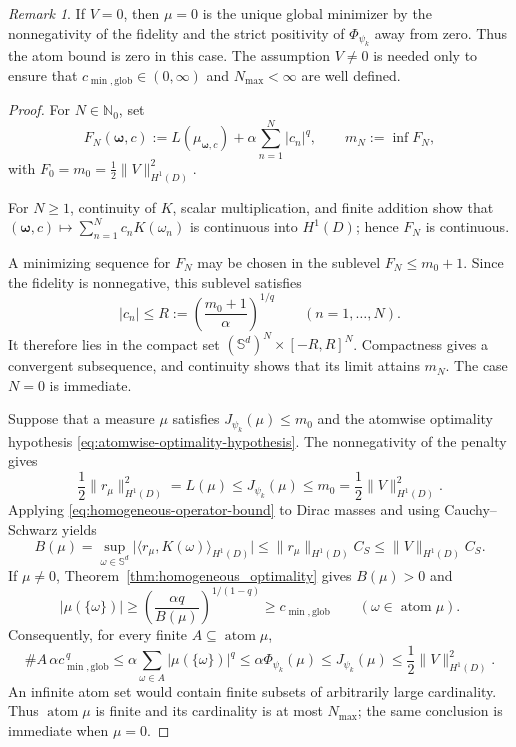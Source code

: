 \documentclass[11pt]{amsart}
\theoremstyle{definition}
\theoremstyle{remark}
\newtheorem{remark}[theorem]{Remark}
\DeclareMathOperator{\atom}{atom}
\begin{document}
\begin{remark}
If $V=0$, then $\mu=0$ is the unique global
minimizer by the nonnegativity of the fidelity and the strict positivity of
$\Phi_{\psi_k}$ away from zero. Thus the atom bound is zero in this case.
The assumption $V\ne0$ is needed only to ensure that
$c_{\min,\mathrm{glob}}\in(0,\infty)$ and $N_{\max}<\infty$ are well defined.
\end{remark}

\begin{proof}
For $N\in\mathbb N_0$, set
\begin{equation*}
	F_N(\boldsymbol\omega,c)
	:=L(\mu_{\boldsymbol\omega,c})+\alpha\sum_{n=1}^N|c_n|^q,
	\qquad m_N:=\inf F_N,
\end{equation*}
with $F_0=m_0=\frac12\|V\|_{H^1(D)}^2$.


For $N\ge1$, continuity of $K$, scalar multiplication, and finite addition
show that
$(\boldsymbol\omega,c)\mapsto\sum_{n=1}^Nc_nK(\omega_n)$ is continuous into
$H^1(D)$; hence $F_N$ is continuous. 

A minimizing sequence for $F_N$ may be chosen
in the sublevel $F_N\le m_0+1$. Since the fidelity is nonnegative, this
sublevel satisfies
\begin{equation*}
	|c_n|\le R:=\left(\frac{m_0+1}{\alpha}\right)^{1/q}
	\qquad(n=1,\ldots,N).
\end{equation*}
It therefore lies in the compact set
$(\mathbb S^d)^N\times[-R,R]^N$. Compactness gives a convergent subsequence,
and continuity shows that its limit attains $m_N$. The case $N=0$ is
immediate.

Suppose that a measure $\mu$ satisfies
$J_{\psi_k}(\mu)\le m_0$ and the atomwise optimality hypothesis
\eqref{eq:atomwise-optimality-hypothesis}.
The nonnegativity of the penalty gives
\begin{equation*}
	\frac12\|r_\mu\|_{H^1(D)}^2
	=L(\mu)\le J_{\psi_k}(\mu)\le m_0
	=\frac12\|V\|_{H^1(D)}^2.
\end{equation*}
Applying \eqref{eq:homogeneous-operator-bound} to Dirac masses and using
Cauchy--Schwarz yields
\begin{equation*}
	B(\mu)=\sup_{\omega\in\mathbb S^d}
	\bigl|\langle r_\mu,K(\omega)\rangle_{H^1(D)}\bigr|
	\le\|r_\mu\|_{H^1(D)}C_S
	\le\|V\|_{H^1(D)}C_S.
\end{equation*}
If $\mu\ne0$, Theorem~\ref{thm:homogeneous_optimality} gives $B(\mu)>0$ and
\begin{equation*}
	|\mu(\{\omega\})|
	\ge\left(\frac{\alpha q}{B(\mu)}\right)^{1/(1-q)}
	\ge c_{\min,\mathrm{glob}}
	\qquad(\omega\in\atom\mu).
\end{equation*}
Consequently, for every finite $A\subseteq\atom\mu$,
\begin{equation*}
	\#A\,\alpha c_{\min,\mathrm{glob}}^{\,q}
	\le\alpha\sum_{\omega\in A}|\mu(\{\omega\})|^q
	\le\alpha\Phi_{\psi_k}(\mu)
	\le J_{\psi_k}(\mu)
	\le\frac12\|V\|_{H^1(D)}^2.
\end{equation*}
An infinite atom set would contain finite subsets of arbitrarily large
cardinality. Thus $\atom\mu$ is finite and its cardinality is at most
$N_{\max}$; the same conclusion is immediate when $\mu=0$.


\end{proof}
\end{document}
